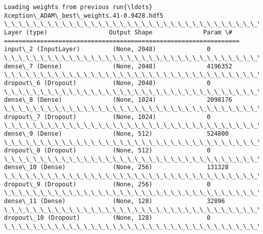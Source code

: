 \documentclass[11pt]{article}
\begin{document}
    \begin{Verbatim}[commandchars=\\\{\}]
Loading weights from previous run{\ldots} Xception\_ADAM\_best\_weights.41-0.9428.hdf5
\_\_\_\_\_\_\_\_\_\_\_\_\_\_\_\_\_\_\_\_\_\_\_\_\_\_\_\_\_\_\_\_\_\_\_\_\_\_\_\_\_\_\_\_\_\_\_\_\_\_\_\_\_\_\_\_\_\_\_\_\_\_\_\_\_
Layer (type)                 Output Shape              Param \#   
=================================================================
input\_2 (InputLayer)         (None, 2048)              0         
\_\_\_\_\_\_\_\_\_\_\_\_\_\_\_\_\_\_\_\_\_\_\_\_\_\_\_\_\_\_\_\_\_\_\_\_\_\_\_\_\_\_\_\_\_\_\_\_\_\_\_\_\_\_\_\_\_\_\_\_\_\_\_\_\_
dense\_7 (Dense)              (None, 2048)              4196352   
\_\_\_\_\_\_\_\_\_\_\_\_\_\_\_\_\_\_\_\_\_\_\_\_\_\_\_\_\_\_\_\_\_\_\_\_\_\_\_\_\_\_\_\_\_\_\_\_\_\_\_\_\_\_\_\_\_\_\_\_\_\_\_\_\_
dropout\_6 (Dropout)          (None, 2048)              0         
\_\_\_\_\_\_\_\_\_\_\_\_\_\_\_\_\_\_\_\_\_\_\_\_\_\_\_\_\_\_\_\_\_\_\_\_\_\_\_\_\_\_\_\_\_\_\_\_\_\_\_\_\_\_\_\_\_\_\_\_\_\_\_\_\_
dense\_8 (Dense)              (None, 1024)              2098176   
\_\_\_\_\_\_\_\_\_\_\_\_\_\_\_\_\_\_\_\_\_\_\_\_\_\_\_\_\_\_\_\_\_\_\_\_\_\_\_\_\_\_\_\_\_\_\_\_\_\_\_\_\_\_\_\_\_\_\_\_\_\_\_\_\_
dropout\_7 (Dropout)          (None, 1024)              0         
\_\_\_\_\_\_\_\_\_\_\_\_\_\_\_\_\_\_\_\_\_\_\_\_\_\_\_\_\_\_\_\_\_\_\_\_\_\_\_\_\_\_\_\_\_\_\_\_\_\_\_\_\_\_\_\_\_\_\_\_\_\_\_\_\_
dense\_9 (Dense)              (None, 512)               524800    
\_\_\_\_\_\_\_\_\_\_\_\_\_\_\_\_\_\_\_\_\_\_\_\_\_\_\_\_\_\_\_\_\_\_\_\_\_\_\_\_\_\_\_\_\_\_\_\_\_\_\_\_\_\_\_\_\_\_\_\_\_\_\_\_\_
dropout\_8 (Dropout)          (None, 512)               0         
\_\_\_\_\_\_\_\_\_\_\_\_\_\_\_\_\_\_\_\_\_\_\_\_\_\_\_\_\_\_\_\_\_\_\_\_\_\_\_\_\_\_\_\_\_\_\_\_\_\_\_\_\_\_\_\_\_\_\_\_\_\_\_\_\_
dense\_10 (Dense)             (None, 256)               131328    
\_\_\_\_\_\_\_\_\_\_\_\_\_\_\_\_\_\_\_\_\_\_\_\_\_\_\_\_\_\_\_\_\_\_\_\_\_\_\_\_\_\_\_\_\_\_\_\_\_\_\_\_\_\_\_\_\_\_\_\_\_\_\_\_\_
dropout\_9 (Dropout)          (None, 256)               0         
\_\_\_\_\_\_\_\_\_\_\_\_\_\_\_\_\_\_\_\_\_\_\_\_\_\_\_\_\_\_\_\_\_\_\_\_\_\_\_\_\_\_\_\_\_\_\_\_\_\_\_\_\_\_\_\_\_\_\_\_\_\_\_\_\_
dense\_11 (Dense)             (None, 128)               32896     
\_\_\_\_\_\_\_\_\_\_\_\_\_\_\_\_\_\_\_\_\_\_\_\_\_\_\_\_\_\_\_\_\_\_\_\_\_\_\_\_\_\_\_\_\_\_\_\_\_\_\_\_\_\_\_\_\_\_\_\_\_\_\_\_\_
dropout\_10 (Dropout)         (None, 128)               0         
\_\_\_\_\_\_\_\_\_\_\_\_\_\_\_\_\_\_\_\_\_\_\_\_\_\_\_\_\_\_\_\_\_\_\_\_\_\_\_\_\_\_\_\_\_\_\_\_\_\_\_\_\_\_\_\_\_\_\_\_\_\_\_\_\_

\end{Verbatim}
\end{document}
